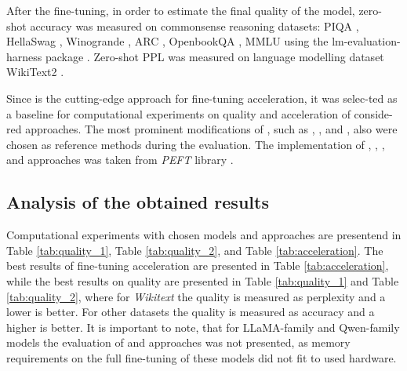 After the fine-tuning, in order to estimate the final quality of the model, zero-shot accuracy was measured on commonsense reasoning datasets: PIQA \cite{piqa}, HellaSwag \cite{hellaswag}, Winogrande \cite{winogrande}, ARC \cite{arc}, OpenbookQA \cite{openbookqa}, MMLU \cite{mmlu} using the lm-evaluation-harness package \cite{lm_eval}. Zero-shot PPL was measured on language modelling dataset WikiText2 \cite{wikitext}. 

Since \lora{} is the cutting-edge approach for fine-tuning acceleration, it was selec-ted as a baseline for computational experiments on quality and acceleration of conside-red approaches. The most prominent modifications of \lora{}, such as \dora{} \cite{dora}, \pissa{} \cite{pissa}, and \adalora{} \cite{adalora}, also \lisa{} \cite{lisa} were chosen as reference methods during the evaluation. The implementation of \lora{}, \dora{}, \pissa{}, and \adalora{} approaches was taken from \textit{PEFT} library \cite{peft}.

\subsection{Analysis of the obtained results}




Computational experiments with chosen models and approaches are presentend in Table \ref{tab:quality_1}, Table \ref{tab:quality_2}, and Table \ref{tab:acceleration}. The best results of fine-tuning acceleration are presented in Table \ref{tab:acceleration}, while the best results on quality are presented in Table \ref{tab:quality_1} and Table \ref{tab:quality_2}, where for \textit{Wikitext} the quality is measured as perplexity and a lower is better. For other datasets the quality is measured as accuracy and a higher is better. It is important to note, that for LLaMA-family and Qwen-family models the evaluation of \lisa{} and \ows{} approaches was not presented, as memory requirements on the full fine-tuning of these models did not fit to used hardware.

